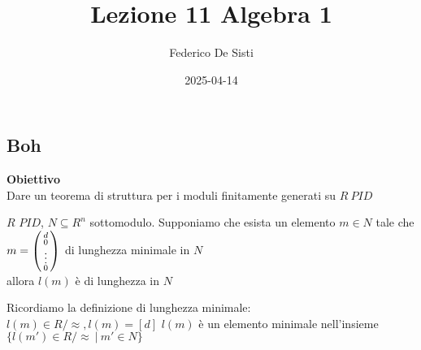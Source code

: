\documentclass[12px]{article}
\title{Lezione 11 Algebra 1}
\date{2025-04-14}
\author{Federico De Sisti}
\begin{document}
	\maketitle
	\newpage
	\subsection{Boh}
	\textbf{Obiettivo}\\
	Dare un teorema di struttura per i moduli finitamente generati su $R \ PID$ \\
	\begin{lemm}[Esercizio]
		$R$ $PID$, $N\subseteq R^n$ sottomodulo. Supponiamo che esista un elemento  $m\in N$ tale che $m = \left(\begin{smallmatrix}d\\0\\\vdots\\ 0\end{smallmatrix}\right)$ di lunghezza minimale in  $N$\\ allora $l(m)$ è di lunghezza  in  $N$
	\end{lemm}
	Ricordiamo la definizione di lunghezza minimale:\\
$l(m)\in R/\approx, l(m) = [d]$  $l(m)$ è un elemento minimale nell'insieme \\
$\{l(m')\in R/\approx\ | \ m'\in N\}$\\
\end{document}
